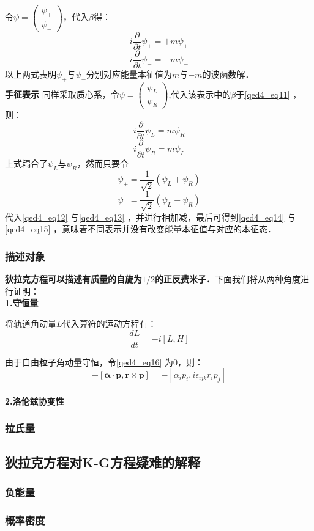 令$\psi=\left(\begin{array}{l}\psi_{+} \\ \psi_{-}\end{array}\right)$，代入$\beta$得：
\begin{equation}\label{qed4_eq14}
i \frac{\partial}{\partial t} \psi_{+}=+m \psi_{+}
\end{equation}
\begin{equation}\label{qed4_eq15}
i \frac{\partial}{\partial t} \psi_{-}=-m \psi_{-}
\end{equation}
以上两式表明$\psi_{+}$与$\psi_{-}$分别对应能量本征值为$m$与$-m$的波函数解．\\\textbf{手征表示} 同样采取质心系，令$\psi=\left(\begin{array}{l}\psi_{L} \\ \psi_{R}\end{array}\right)$,代入该表示中的$\beta$于\autoref{qed4_eq11} ，则：
\begin{equation}\label{qed4_eq12}
i \frac{\partial}{\partial t} \psi_{L}=m \psi_{R}
\end{equation}
\begin{equation}\label{qed4_eq13}
i \frac{\partial}{\partial t} \psi_{R}=m \psi_{L}
\end{equation}
上式耦合了$\psi_{L}$与$\psi_{R}$，然而只要令
\begin{equation}
\psi_{+}=\frac{1}{\sqrt{2}}\left(\psi_{L}+\psi_{R}\right)
\end{equation}
\begin{equation}
\psi_{-}=\frac{1}{\sqrt{2}}\left(\psi_{L}-\psi_{R}\right)
\end{equation}
代入\autoref{qed4_eq12} 与\autoref{qed4_eq13} ，并进行相加减，最后可得到\autoref{qed4_eq14} 与\autoref{qed4_eq15} ，意味着不同表示并没有改变能量本征值与对应的本征态．
\subsubsection{描述对象}
\textbf{狄拉克方程可以描述有质量的自旋为$1/2$的正反费米子．}下面我们将从两种角度进行证明：\\
\textbf{1.守恒量}

将轨道角动量$L$代入算符的运动方程有：
\begin{equation}\label{qed4_eq16}
\frac{d {L}}{d t}=-i[L,H]
\end{equation}

由于自由粒子角动量守恒，令\autoref{qed4_eq16} 为0，则：
\begin{equation}
[L,H]=
-\left[\boldsymbol{\alpha} \cdot \boldsymbol{p},\boldsymbol{r} \times \boldsymbol{p}\right]
=-[\alpha_ip_i,i\epsilon_{ijk}r_ip_j]=
\end{equation}
\\\textbf{2.洛伦兹协变性}
\subsubsection{拉氏量}
\subsection{狄拉克方程对K-G方程疑难的解释}
\subsubsection{负能量}
\subsubsection{概率密度}




